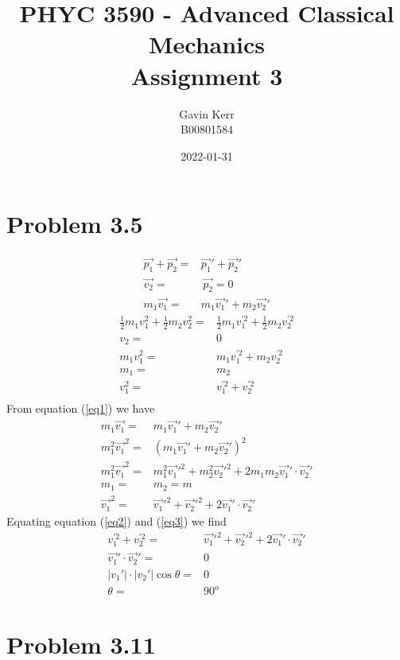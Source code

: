 \documentclass[12pt, a4paper]{article}
\title{PHYC 3590 - Advanced Classical Mechanics\\Assignment 3}
\author{Gavin Kerr\\B00801584}
\date{2022-01-31}
\begin{document}
\maketitle


\section*{Problem 3.5}
\begin{align}
\vec{p_1} + \vec{p_2} =& \vec{p_1}' + \vec{p_2}'
\\
\vec{v_2} =& \, \vec{p_2} = 0
\\
m_1\vec{v_1} =& m_1\vec{v_1}' + m_2\vec{v_2}' \label{eq1}
\end{align}
\begin{align}
\tfrac{1}{2}m_1v_1^2 + \tfrac{1}{2}m_2v_2^2 =& \tfrac{1}{2}m_1v_1^{'2} + \tfrac{1}{2}m_2v_2^{'2}
\\
v_2 =& 0
\\
m_1v_1^2 =& m_1v_1^{'2} + m_2v_2^{'2} 
\\
m_1 =& m_2
\\
v_1^2 =& v_1^{'2} + v_2^{'2} \label{eq2}
\\
\end{align}
From equation (\ref{eq1}) we have
\begin{align}
m_1\vec{v_1} =& m_1\vec{v_1}' + m_2\vec{v_2}' 
\\
m_1^2\vec{v_1}^2 =& (m_1\vec{v_1}' + m_2\vec{v_2}')^2 
\\
m_1^2\vec{v_1}^2 =& m_1^2 \vec{v_1}'^2  + m_2^2 \vec{v_2}'^2 + 2m_1m_2\vec{v_1}'\cdot\vec{v_2}'
\\
m_1 =& m_2 = m
\\
\vec{v_1}^2 =& \vec{v_1}'^2  + \vec{v_2}'^2 + 2\vec{v_1}'\cdot\vec{v_2}' \label{eq3}
\end{align}
Equating equation (\ref{eq2}) and (\ref{eq3}) we find
\begin{align*}
v_1^{'2} + v_2^{'2} =& \vec{v_1}'^2  + \vec{v_2}'^2 + 2\vec{v_1}'\cdot\vec{v_2}'
\\
\vec{v_1}'\cdot\vec{v_2}' =& 0
\\
|v_1'| \cdot |v_2'| \cos\theta =& 0
\\
\theta =& \boxed{90^o}
\end{align*}




\pagebreak
\section*{Problem 3.11}
\end{document}

